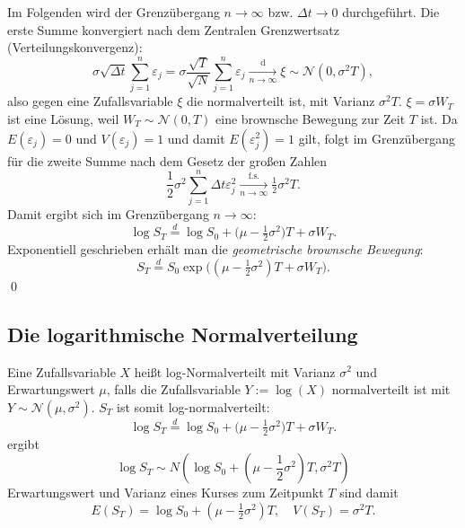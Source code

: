 Im Folgenden wird der Grenzübergang $n \longrightarrow \infty$ bzw. $\Delta t \longrightarrow 0$ durchgeführt. 
Die erste Summe konvergiert nach dem Zentralen Grenzwertsatz (Verteilungskonvergenz):
$$
\sigma \sqrt{\Delta t} \sum_{j=1}^n \varepsilon_j = \sigma \frac{\sqrt{T}}{\sqrt{N}} \sum_{j=1}^n \varepsilon_j  \xrightarrow[n \to \infty]{\mathrm{d}} \xi \sim \mathcal N(0, \sigma^2 T),
$$
also gegen eine Zufallsvariable $\xi$ die normalverteilt ist, mit Varianz $\sigma^2 T$.  $\xi = \sigma W_T$ ist eine Lösung, 
weil $W_T \sim \mathcal N(0, T)$ eine brownsche Bewegung zur Zeit $T$ ist. 
Da $E(\varepsilon_j)=0$ und $V(\varepsilon_j)=1$ und damit $E(\varepsilon_j^2) = 1$ gilt, folgt im Grenzübergang für die zweite Summe nach dem Gesetz der großen Zahlen
$$
\frac{1}{2} \sigma^2 \sum_{j=1}^{n} \Delta t \varepsilon_j^2  \xrightarrow[n \to \infty]{\mathrm{f.s.}} \tfrac12 \sigma^2 T.
$$
Damit ergibt sich im Grenzübergang $n \to \infty$:
$$
\log S_T \overset{d} = \log S_0 + \big(\mu - \tfrac12 \sigma^2\big)T + \sigma W_T.
$$Exponentiell geschrieben erhält man die \textit{geometrische brownsche Bewegung}:
$$
S_T \overset d = S_0 \exp\!\Big( (\mu - \tfrac12 \sigma^2)T + \sigma W_T \Big).
$$
\qed
\subsection{Die logarithmische Normalverteilung}

Eine Zufallsvariable $X$ heißt log-Normalverteilt mit Varianz $\sigma^2$ und Erwartungswert $\mu$, 
falls die Zufallsvariable $Y := \log(X)$ normalverteilt ist mit $Y \sim \mathcal N(\mu, \sigma^2)$.
$S_T$ ist somit log-normalverteilt:
$$\log S_T \overset{d} = \log S_0 + \big(\mu - \tfrac12 \sigma^2\big)T + \sigma W_T.$$
ergibt
$$\log S_T \sim N\left( \log S_0 + \left( \mu - \frac{1}{2} \sigma^2 \right)T , \sigma^2 T\right)$$
Erwartungswert und Varianz eines Kurses zum Zeitpunkt $T$ sind damit
$$E(S_T)=\log S_0 + (\mu - \tfrac12 \sigma^2)T, \quad V(S_T)=\sigma^2 T.$$
